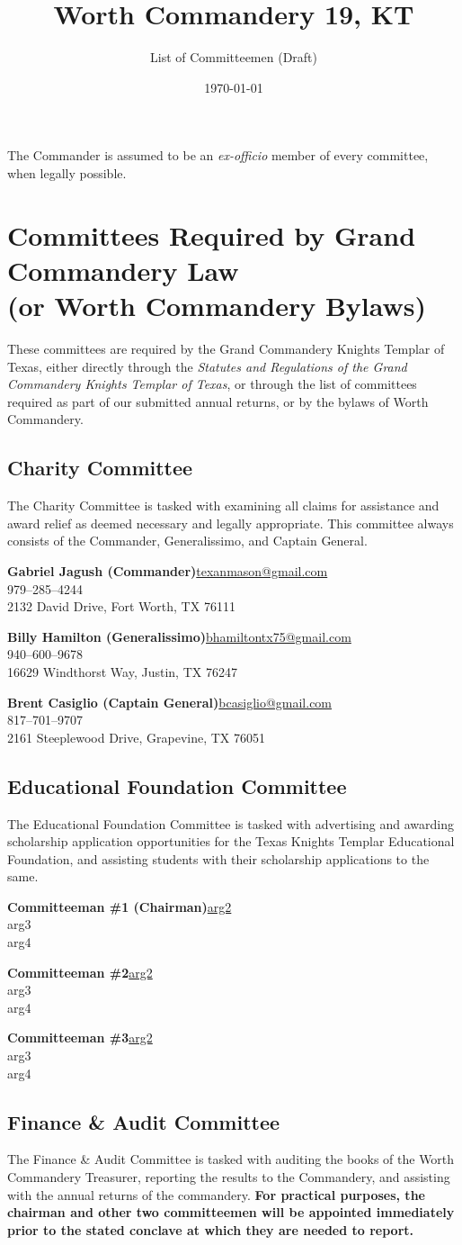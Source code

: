 \documentclass[letterpaper]{article}
\title{\vspace*{-5em}Worth Commandery \textnumero{} 19, KT\vspace*{-1em}}
\author{List of Committeemen (Draft)}
\date{\vspace*{-1em}\today}
\newcommand{\cman}[4]{\textbf{#1}\hfill{}\url{#2}\\\hphantom{0em}\hfill{}#3\\\hphantom{0em}\hfill{}#4}
\newcommand{\comm}[3]{\subsection*{#1 Committee\textsuperscript{#2}}The #1 Committee is tasked with #3}
\newcommand{\mand}{\CrossMaltese}
\begin{document}
	\maketitle
	
	The Commander is assumed to be an \textit{ex-officio} member of every committee, when legally possible.
	
	\section*{Committees Required by Grand Commandery Law\\(or Worth Commandery Bylaws)}
	
	These committees are required by the Grand Commandery Knights Templar of Texas, either directly through the \textit{Statutes and Regulations of the Grand Commandery Knights Templar of Texas}, or through the list of committees required as part of our submitted annual returns, or by the bylaws of Worth Commandery.
	
	\comm{Charity}{\mand}{examining all claims for assistance and award relief as deemed necessary and legally appropriate. This committee always consists of the Commander, Generalissimo, and Captain General.}
	
		\cman{Gabriel Jagush (Commander)}{texanmason@gmail.com}{979--285--4244}{2132 David Drive, Fort Worth, TX 76111}
		
		\cman{Billy Hamilton (Generalissimo)}{bhamiltontx75@gmail.com}{940--600--9678}{16629 Windthorst Way, Justin, TX 76247}
		
		\cman{Brent Casiglio (Captain General)}{bcasiglio@gmail.com}{817--701--9707}{2161 Steeplewood Drive, Grapevine, TX 76051}
	
	\comm{Educational Foundation}{\mand}{advertising and awarding scholarship application opportunities for the Texas Knights Templar Educational Foundation, and assisting students with their scholarship applications to the same.}
	
		\cman{Committeeman \#1 (Chairman)}{arg2}{arg3}{arg4}
		
		\cman{Committeeman \#2}{arg2}{arg3}{arg4}
		
		\cman{Committeeman \#3}{arg2}{arg3}{arg4}
	
	\comm{Finance \& Audit}{\mand}{auditing the books of the Worth Commandery Treasurer, reporting the results to the Commandery, and assisting with the annual returns of the commandery. \textbf{For practical purposes, the chairman and other two committeemen will be appointed immediately prior to the stated conclave at which they are needed to report.}}
	
\end{document}
